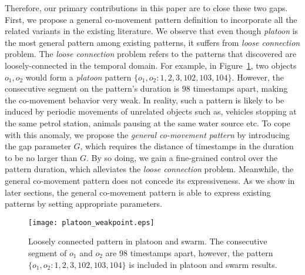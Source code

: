 Therefore, our primary contributions in this paper are to close these two gaps. First, we propose a general co-movement pattern definition to incorporate all the related variants in the existing literature. We observe that even though \emph{platoon} is the most general pattern among existing patterns, it suffers from \emph{loose connection} problem. 
The \emph{loose connection} problem refers to the patterns that discovered 
are loosely-connected in the temporal domain. For example, in Figure~\ref{fig:platoon_weakpoint}, two objects $o_1, o_2$ 
would form a \emph{platoon} pattern $\{o_1,o_2:1,2,3, 102,103,104\}$. However, the consecutive segment on the pattern's 
duration is $98$ timestamps apart, making the co-movement behavior very weak.
%
%
In reality, such a pattern is likely to be induced by periodic movements of unrelated objects such as, vehicles stopping at the same petrol station, animals pausing at the same water source etc. To cope with this anomaly, we propose the \emph{general co-movement pattern} by introducing the gap parameter $G$, which requires the distance of timestamps in the duration to be no larger than $G$. By so doing, we gain a fine-grained control over the pattern duration, which alleviates the \emph{loose connection} problem. Meanwhile, the general co-movement pattern does not concede its expressiveness. As we show in later sections, the general co-movement pattern is able to express existing patterns by setting appropriate parameters. 

%
\begin{figure}[h]
\center
\texttt{[image: platoon\_weakpoint.eps]}
\caption{Loosely connected pattern in platoon and swarm. The consecutive segment of $o_1$ and $o_2$ are 98 timestamps apart, however, the pattern $\{o_1, o_2: 1,2,3,102,103,104\}$ is included in platoon and swarm results.}
\label{fig:platoon_weakpoint}
\end{figure}
 
